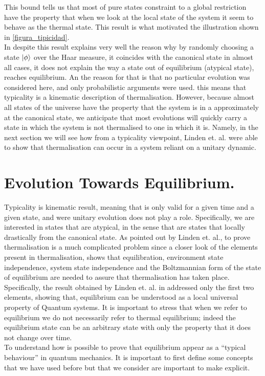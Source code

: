 This bound tells us that most of pure states constraint to a global restriction have the property that when we look at the local state of the system it seem to behave as the thermal state. This result is what motivated the illustration shown in \ref{figura_tipicidad}.\\
\indent In despite this result explains very well the reason why by randomly choosing a state $\mathinner{|{\phi}\rangle}$ over the Haar measure, it coincides with the canonical state in almost all cases, it does not explain the way a state out of equilibrium (atypical state), reaches equilibrium. An the reason for that is that no particular evolution was considered here, and only probabilistic arguments were used. this means that typicality is a kinematic description of thermalisation. However, because almost all states of the universe have the property that the system is in a approximately at the canonical state, we anticipate that most evolutions will quickly carry a state in which the system is not thermalised to one in which it is. Namely, in the next section we will see how from a typicality viewpoint,  Linden et. al.\cite{linden_quantum_2009} were able to show that thermalisation can occur in a system reliant on a unitary dynamic.

\section{Evolution Towards Equilibrium.}

Typicality is kinematic result, meaning that is only valid for a given time and a given state, and were unitary evolution does not play a role. Specifically, we are interested in states that are atypical, in the sense that are states that locally drastically from the canonical state. As pointed out by Linden et. al.\cite{linden_quantum_2009}, to prove thermalisation is a much complicated problem since a closer look of the elements present in thermalisation, shows that equilibration, environment state independence, system state independence and the Boltzmannian form of the state of equilibrium are needed to assure that thermalisation has taken place. Specifically, the result obtained by Linden et. al. in \cite{linden_quantum_2009} addressed only the first two elements, showing that, equilibrium can be understood as a local universal property of Quantum systems. It is important to stress that when we refer to equilibrium we do not necessarily refer to thermal equilibrium; indeed the equilibrium state can be an arbitrary state with only the property that it does not change over time.\\
\indent To understand how is possible to prove that equilibrium appear as a ``typical behaviour'' in quantum mechanics. It is important to first define some concepts that we have used before but that we consider are important to make explicit.\\


